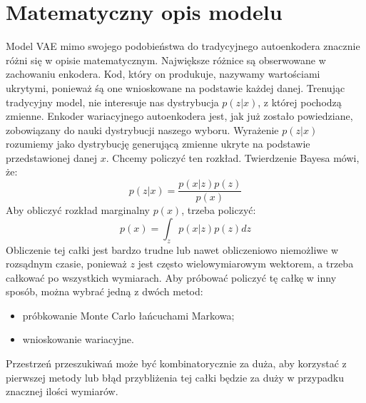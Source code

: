 \documentclass[a4paper,12pt,oneside]{book} %
\begin{document}
\section{Matematyczny opis modelu}
Model VAE mimo swojego podobieństwa do tradycyjnego autoenkodera znacznie różni się w opisie matematycznym. Największe różnice są obserwowane w zachowaniu enkodera. Kod, który on produkuje, nazywamy wartościami ukrytymi, ponieważ śą one wnioskowane na podstawie każdej danej. Trenując tradycyjny model, nie interesuje nas dystrybucja $p(z|x)$, z której pochodzą zmienne. Enkoder wariacyjnego autoenkodera jest, jak już zostało powiedziane, zobowiązany do nauki dystrybucji naszego wyboru. Wyrażenie $p(z|x)$ rozumiemy jako dystrybucję generującą zmienne ukryte na podstawie przedstawionej danej $x$. Chcemy policzyć ten rozkład. Twierdzenie Bayesa mówi, że:
\begin{equation}
	p(z|x)=\dfrac{p(x|z)p(z)}{p(x)}
	\label{bayes}
\end{equation}
Aby obliczyć rozkład marginalny $p(x)$, trzeba policzyć:
\begin{equation}
	p(x) = \displaystyle\int_{z}^{}p(x|z)p(z)dz
	\label{pxcalka}
\end{equation}
Obliczenie tej całki jest bardzo trudne lub nawet obliczeniowo niemożliwe w rozsądnym czasie, ponieważ $z$ jest często wielowymiarowym wektorem, a trzeba całkować po wszystkich wymiarach. Aby próbować policzyć tę całkę w inny sposób, można wybrać jedną z dwóch metod:
\begin{itemize}
	\item próbkowanie Monte Carlo łańcuchami Markowa;
	\item wnioskowanie wariacyjne.
\end{itemize}
Przestrzeń przeszukiwań może być kombinatorycznie za duża, aby korzystać z pierwszej metody lub błąd przybliżenia tej całki będzie za duży w przypadku znacznej ilości wymiarów.
\end{document}
